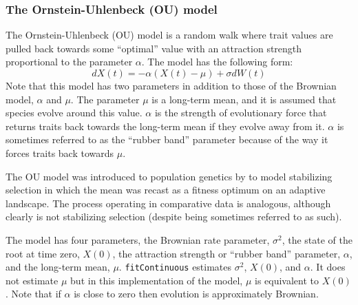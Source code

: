 \documentclass[11pt]{article}
\begin{document}
\subsubsection{The Ornstein-Uhlenbeck (OU) model}
The Ornstein-Uhlenbeck (OU) model \citep{hansen1997stabilizing,butler2004phylogenetic} is a random walk where trait values are pulled back towards some ``optimal'' value with an attraction strength proportional to the parameter $\alpha$. The model has the following form:
\begin{equation}
dX(t) = -\alpha(X(t) - \mu) + \sigma dW(t)
\end{equation}
Note that this model has two parameters in addition to those of the Brownian model, $\alpha$ and $\mu$. The parameter $\mu$ is a long-term mean, and it is assumed that species evolve around this value. $\alpha$ is the strength of evolutionary force that returns traits back towards the long-term mean if they evolve away from it. $\alpha$ is sometimes referred to as the ``rubber band'' parameter because of the way it forces traits back towards $\mu$.

The OU model was introduced to population genetics by \cite{lande1976natural} to model stabilizing selection in which the mean was recast as a fitness optimum on an adaptive landscape. The process operating in comparative data is analogous, although clearly is not stabilizing selection (despite being sometimes referred to as such). 



The model has four parameters, the Brownian rate parameter, $\sigma^2$, the state of the root at time zero, $X(0)$, the attraction strength or ``rubber band'' parameter, $\alpha$, and the long-term mean, $\mu$. \texttt{fitContinuous} estimates $\sigma^2$, $X(0)$, and $\alpha$. It does not estimate $\mu$ but in this implementation of the model, $\mu$ is equivalent to $X(0)$. Note that if $\alpha$ is close to zero then evolution is approximately Brownian.
\end{document}
